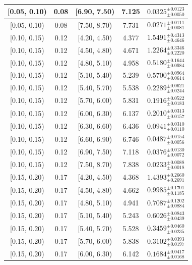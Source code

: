 \begin{longtable}{|c|c|c|c|c|}
\hline
[0.05, 0.10) & 0.08 & [6.90, 7.50) & 7.125 & $0.0325^{ \pm 0.0123 }_{ \pm 0.0050 }$ \\ 
\hline
[0.05, 0.10) & 0.08 & [7.50, 8.70) & 7.731 & $0.0271^{ \pm 0.0111 }_{ \pm 0.0081 }$ \\ 
\hline
[0.10, 0.15) & 0.12 & [4.20, 4.50) & 4.377 & $1.5491^{ \pm 0.4313 }_{ \pm 0.4646 }$ \\ 
\hline
[0.10, 0.15) & 0.12 & [4.50, 4.80) & 4.671 & $1.2264^{ \pm 0.3346 }_{ \pm 0.2220 }$ \\ 
\hline
[0.10, 0.15) & 0.12 & [4.80, 5.10) & 4.958 & $0.5180^{ \pm 0.1644 }_{ \pm 0.0984 }$ \\ 
\hline
[0.10, 0.15) & 0.12 & [5.10, 5.40) & 5.239 & $0.5700^{ \pm 0.0964 }_{ \pm 0.0614 }$ \\ 
\hline
[0.10, 0.15) & 0.12 & [5.40, 5.70) & 5.538 & $0.2289^{ \pm 0.0621 }_{ \pm 0.0244 }$ \\ 
\hline
[0.10, 0.15) & 0.12 & [5.70, 6.00) & 5.831 & $0.1916^{ \pm 0.0522 }_{ \pm 0.0183 }$ \\ 
\hline
[0.10, 0.15) & 0.12 & [6.00, 6.30) & 6.137 & $0.2010^{ \pm 0.0313 }_{ \pm 0.0157 }$ \\ 
\hline
[0.10, 0.15) & 0.12 & [6.30, 6.60) & 6.436 & $0.0941^{ \pm 0.0310 }_{ \pm 0.0110 }$ \\ 
\hline
[0.10, 0.15) & 0.12 & [6.60, 6.90) & 6.746 & $0.0487^{ \pm 0.0154 }_{ \pm 0.0056 }$ \\ 
\hline
[0.10, 0.15) & 0.12 & [6.90, 7.50) & 7.118 & $0.0376^{ \pm 0.0130 }_{ \pm 0.0072 }$ \\ 
\hline
[0.10, 0.15) & 0.12 & [7.50, 8.70) & 7.838 & $0.0233^{ \pm 0.0088 }_{ \pm 0.0018 }$ \\ 
\hline
[0.15, 0.20) & 0.17 & [4.20, 4.50) & 4.368 & $1.4393^{ \pm 0.2660 }_{ \pm 0.2691 }$ \\ 
\hline
[0.15, 0.20) & 0.17 & [4.50, 4.80) & 4.662 & $0.9985^{ \pm 0.1701 }_{ \pm 0.1185 }$ \\ 
\hline
[0.15, 0.20) & 0.17 & [4.80, 5.10) & 4.941 & $0.7087^{ \pm 0.1202 }_{ \pm 0.0884 }$ \\ 
\hline
[0.15, 0.20) & 0.17 & [5.10, 5.40) & 5.243 & $0.6026^{ \pm 0.0843 }_{ \pm 0.0439 }$ \\ 
\hline
[0.15, 0.20) & 0.17 & [5.40, 5.70) & 5.528 & $0.3459^{ \pm 0.0460 }_{ \pm 0.0235 }$ \\ 
\hline
[0.15, 0.20) & 0.17 & [5.70, 6.00) & 5.838 & $0.3102^{ \pm 0.0393 }_{ \pm 0.0197 }$ \\ 
\hline
[0.15, 0.20) & 0.17 & [6.00, 6.30) & 6.142 & $0.1684^{ \pm 0.0417 }_{ \pm 0.0168 }$ \\ 

\end{longtable}
